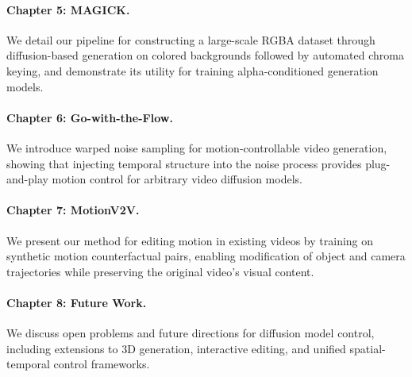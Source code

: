 \paragraph{Chapter 5: MAGICK.} We detail our pipeline for constructing a large-scale RGBA dataset through diffusion-based generation on colored backgrounds followed by automated chroma keying, and demonstrate its utility for training alpha-conditioned generation models.

\paragraph{Chapter 6: Go-with-the-Flow.} We introduce warped noise sampling for motion-controllable video generation, showing that injecting temporal structure into the noise process provides plug-and-play motion control for arbitrary video diffusion models.

\paragraph{Chapter 7: MotionV2V.} We present our method for editing motion in existing videos by training on synthetic motion counterfactual pairs, enabling modification of object and camera trajectories while preserving the original video's visual content.

\paragraph{Chapter 8: Future Work.} We discuss open problems and future directions for diffusion model control, including extensions to 3D generation, interactive editing, and unified spatial-temporal control frameworks.
